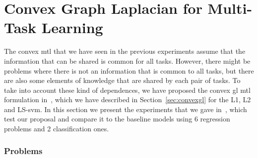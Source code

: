 










\section{Convex Graph Laplacian for Multi-Task Learning}\label{sec:convexgl_experiments}
%
The convex \acrshort{mtl} that we have seen in the previous experiments assume that the information that can be shared is common for all tasks. However, there might be problems where there is not an information that is common to all tasks, but there are also some elements of knowledge that are shared by each pair of tasks. 
%
To take into account these kind of dependences, we have proposed the convex \acrshort{gl} \acrshort{mtl} formulation in~\cite{RuizAD20}, which we have described in Section~\ref{sec:convexgl} for the L1, L2 and LS-\acrshort{svm}.
%
In this section we present the experiments that we gave in~\cite{RuizAD20}, which test our proposal and compare it to the baseline models using \num{6} regression problems and \num{2} classification ones.

\subsubsection*{Problems}

